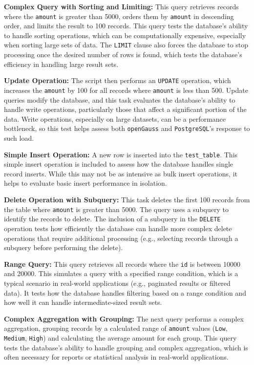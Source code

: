 \documentclass[12pt,a4paper,cs4size]{ctexart}
\begin{document}
\newpage

\textbf{Complex Query with Sorting and Limiting:} This query retrieves records where the \texttt{amount} is greater than 5000, orders them by \texttt{amount} in descending order, and limits the result to 100 records. This query tests the database's ability to handle sorting operations, which can be computationally expensive, especially when sorting large sets of data. The \texttt{LIMIT} clause also forces the database to stop processing once the desired number of rows is found, which tests the database's efficiency in handling large result sets.


\textbf{Update Operation:} The script then performs an \texttt{UPDATE} operation, which increases the \texttt{amount} by 100 for all records where \texttt{amount} is less than 500. Update queries modify the database, and this task evaluates the database's ability to handle write operations, particularly those that affect a significant portion of the data. Write operations, especially on large datasets, can be a performance bottleneck, so this test helps assess both \texttt{openGauss} and \texttt{PostgreSQL}'s response to such load.

\textbf{Simple Insert Operation:} A new row is inserted into the \texttt{test\_table}. This simple insert operation is included to assess how the database handles single record inserts. While this may not be as intensive as bulk insert operations, it helps to evaluate basic insert performance in isolation.

\textbf{Delete Operation with Subquery:} This task deletes the first 100 records from the table where \texttt{amount} is greater than 5000. The query uses a subquery to identify the records to delete. The inclusion of a subquery in the \texttt{DELETE} operation tests how efficiently the database can handle more complex delete operations that require additional processing (e.g., selecting records through a subquery before performing the delete).

\textbf{Range Query:} This query retrieves all records where the \texttt{id} is between 10000 and 20000. This simulates a query with a specified range condition, which is a typical scenario in real-world applications (e.g., paginated results or filtered data). It tests how the database handles filtering based on a range condition and how well it can handle intermediate-sized result sets.

\textbf{Complex Aggregation with Grouping:} The next query performs a complex aggregation, grouping records by a calculated range of \texttt{amount} values (\texttt{Low}, \texttt{Medium}, \texttt{High}) and calculating the average amount for each group. This query tests the database's ability to handle grouping and complex aggregation, which is often necessary for reports or statistical analysis in real-world applications.
\end{document}
